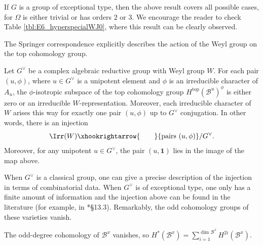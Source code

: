 If $G$ is a group of exceptional type, then the above result covers all possible cases, for $\Omega$ is either trivial or has orders $2$ or $3$. We encourage the reader to check Table \ref{tbl:E6_hyperspecialWJ0}, where this result can be clearly observed.

\newpage







The Springer correspondence explicitly describes the action of the Weyl group on the top cohomology group.

\begin{theorem}
    Let $G^\vee$ be a complex algebraic reductive group with Weyl group $W$. For each pair $(u,\phi)$, where $u\in G^\vee$ is a unipotent element and $\phi$ is an irreducible character of $A_u$, the $\phi$-isotropic subspace of the top cohomology group $H^{\mathrm{top}}(\mathcal{B}^u)^\phi$ is either zero or an irreducible $W$-representation. Moreover, each irreducible character of $W$ arises this way for exactly one pair $(u,\phi)$ up to $G^\vee$ conjugation. In other words, there is an injection
    $$\Irr(W)\xhookrightarrow{\quad\quad}\{\textrm{pairs }(u,\phi)\}/G^\vee.$$
    Moreover, for any unipotent $u\in G^\vee$, the pair $(u,\mathbf{1})$ lies in the image of the map above.
\end{theorem}
When $G^\vee$ is a classical group, one can give a precise description of the injection in terms of combinatorial data. When $G^\vee$ is of exceptional type, one only has a finite amount of information and the injection above can be found in the literature (for example, in \cite{Carter1985}*{\S 13.3}). Remarkably, the odd cohomology groups of these varieties vanish.

\begin{theorem}\label{thm:odd_vanish}
    The odd-degree cohomology of $\mathcal{B}^x$ vanishes, so $H^*(\mathcal{B}^x)=\sum_{i=1}^{\dim\mathcal{B}^x}H^{2i}(\mathcal{B}^x)$.
\end{theorem}

